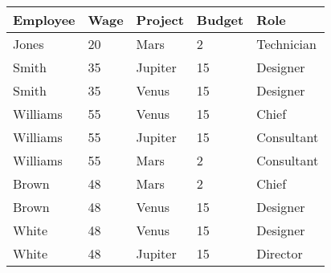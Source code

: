 \begin{center}
	\begin{tabular}{lllll}
		\toprule
		\textbf{Employee} & \textbf{Wage} & \textbf{Project} & \textbf{Budget} & \textbf{Role} \\
		\midrule
		Jones    & 20   & Mars     & 2      & Technician \\
		Smith    & 35   & Jupiter  & 15     & Designer   \\
		Smith    & 35   & Venus    & 15     & Designer   \\
		Williams & 55   & Venus    & 15     & Chief      \\
		Williams & 55   & Jupiter  & 15     & Consultant \\
		Williams & 55   & Mars     & 2      & Consultant \\
		Brown    & 48   & Mars     & 2      & Chief      \\
		Brown    & 48   & Venus    & 15     & Designer   \\
		White    & 48   & Venus    & 15     & Designer   \\
		White    & 48   & Jupiter  & 15     & Director   \\
		\bottomrule
	\end{tabular}
\end{center}

